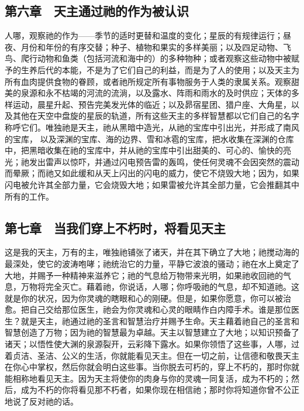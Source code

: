 \subsection{第六章　天主通过祂的作为被认识}

人哪，观察祂的作为——季节的适时更替和温度的变化；星辰的有规律运行；昼夜、月份和年份的有序交替；种子、植物和果实的多样美丽；以及四足动物、飞鸟、爬行动物和鱼类（包括河流和海中的）的多种物种；或者观察这些动物中被赋予的生养后代的本能，不是为了它们自己的利益，而是为了人的使用；以及天主为所有血肉提供食物的眷顾，或者祂所规定所有事物服务于人类的隶属关系。观察甜美的泉源和永不枯竭的河流的流淌，以及露水、阵雨和雨水的及时供应；天体的多样运动，晨星升起、预告完美发光体的临近；以及昴宿星团、猎户座、大角星，以及其他在天空中盘旋的星辰的轨道，所有这些天主的多样智慧都以它们自己的名字称呼它们。唯独祂是天主，祂从黑暗中造光，从祂的宝库中引出光，并形成了南风的宝库， 以及深渊的宝库、海的边界、雪和冰雹的宝库，把水收集在深渊的仓库中，把黑暗收集在祂的宝库中，并从祂的宝库中引出甜美的、可心的、愉快的亮光；祂发出雷声以惊吓，并通过闪电预告雷的轰鸣，使任何灵魂不会因突然的震动而晕厥；而祂又如此缓和从天上闪出的闪电的威力，使它不烧毁大地；因为，如果闪电被允许其全部力量，它会烧毁大地；如果雷被允许其全部力量，它会推翻其中所有的工作。\par


\subsection{第七章　当我们穿上不朽时，将看见天主}

这是我的天主，万有的主，唯独祂铺张了诸天，并在其下确立了大地；祂搅动海的最深处，使它的波涛咆哮；祂统治它的力量，平静它波浪的骚动；祂在水上奠定了大地，并赐予一种精神来滋养它；祂的气息给万物带来光明，如果祂收回祂的气息，万物将完全灭亡。藉着祂，你说话，人哪；你呼吸祂的气息，却不知道祂。这就是你的状况，因为你灵魂的瞎眼和心的刚硬。但是，如果你愿意，你可以被治愈。把自己交给那位医生，祂会为你灵魂和心灵的眼睛作白内障手术。谁是那位医生？就是天主，祂通过祂的圣言和智慧治疗并赐予生命。天主藉着祂自己的圣言和智慧创造了万物；因为祂的智慧最为卓越。天主以智慧建立了大地；以知识预备了诸天；以悟性使大渊的泉源裂开，云彩降下露水。如果你领悟了这些事，人哪，过着贞洁、圣洁、公义的生活，你就能看见天主。但在一切之前，让信德和敬畏天主在你心中掌权，然后你就会明白这些事。当你脱去可朽的，穿上不朽的，那时你就能相称地看见天主。因为天主将使你的肉身与你的灵魂一同复活，成为不朽的；然后，成为不朽的你将看见那不朽者，如果你现在相信祂；那时你将知道你曾不公正地说了反对祂的话。\par

